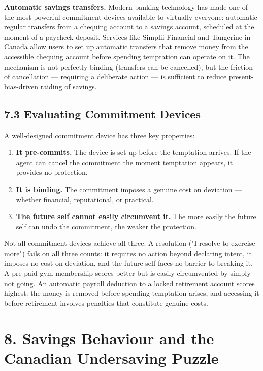 \documentclass[12pt, letterpaper]{article}
\begin{document}
\textbf{Automatic savings transfers.} Modern banking technology has made one of the most powerful commitment devices available to virtually everyone: automatic regular transfers from a chequing account to a savings account, scheduled at the moment of a paycheck deposit. Services like Simplii Financial and Tangerine in Canada allow users to set up automatic transfers that remove money from the accessible chequing account before spending temptation can operate on it. The mechanism is not perfectly binding (transfers can be cancelled), but the friction of cancellation --- requiring a deliberate action --- is sufficient to reduce present-bias-driven raiding of savings.


\subsection{7.3 Evaluating Commitment Devices}


A well-designed commitment device has three key properties:
\begin{enumerate}
\item \textbf{It pre-commits.} The device is set up before the temptation arrives. If the agent can cancel the commitment the moment temptation appears, it provides no protection.
\item \textbf{It is binding.} The commitment imposes a genuine cost on deviation --- whether financial, reputational, or practical.
\item \textbf{The future self cannot easily circumvent it.} The more easily the future self can undo the commitment, the weaker the protection.
\end{enumerate}

Not all commitment devices achieve all three. A resolution ("I resolve to exercise more") fails on all three counts: it requires no action beyond declaring intent, it imposes no cost on deviation, and the future self faces no barrier to breaking it. A pre-paid gym membership scores better but is easily circumvented by simply not going. An automatic payroll deduction to a locked retirement account scores highest: the money is removed before spending temptation arises, and accessing it before retirement involves penalties that constitute genuine costs.

\medskip


\section{8. Savings Behaviour and the Canadian Undersaving Puzzle}
\end{document}
